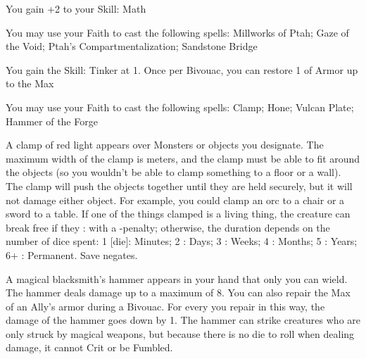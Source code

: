 {\GOD[
Name=Ptah,
Link=small-god-ptah,
GodOf=God of Builders,
Holy=an amulet in the shape of an ankh
]


You gain +2 to your Skill: Math


You may use your Faith to cast the following spells: Millworks of Ptah; Gaze of the Void; Ptah's Compartmentalization; Sandstone Bridge







\GOD[
Name=Vulcan,
Link=small-god-vulcan,
GodOf=Seraph of the Forge,
Holy=a small crude homonculous hammered from iron
]


You gain the Skill: Tinker at 1.  Once per Bivouac, you can restore 1 \UD of Armor up to the Max 


You may use your Faith to cast the following spells: Clamp; Hone; Vulcan Plate; Hammer of the Forge

\LITURGY [
  Name= Clamp,
  Link= vulcan-liturgy-clamp,
  Paradigm= Force ,
  Save=  Y (negates) ,
  Duration= varies ,
  Counter=  n/a  ,
  Keywords= Contested ,
  Target=   Nearby object or Monster
]



A clamp of red light appears over \DICE Monsters or objects you designate. The maximum width of the clamp is \DICE meters, and the clamp must be able to fit around the objects (so you wouldn't be able to clamp something to a floor or a wall).  The clamp will push the objects together until they are held securely, but it will not damage either object.  For example, you could clamp an orc to a chair or a sword to a table.  If one of the things clamped is a living thing, the creature can break free if they \RB : \VIG with a -\DICE penalty; otherwise, the duration depends on the number of dice spent:  1 [die]: Minutes; 2 \DICE: Days; 3 \DICE: Weeks; 4 \DICE: Months; 5 \DICE: Years; 6+ \DICE: Permanent.  Save negates.

\LITURGY [
  Name= Hammer of the Forge,
  Link=vulcan-liturgy-hammer,
  Paradigm= Force ,
  Save=  N ,
  Duration= Session ,
  Counter=  n/a  ,
  Keywords= None ,
  Target=   Self
]



A magical blacksmith's hammer appears in your hand that only you can wield.  The hammer deals \DICE damage up to a maximum of 8.  You can also repair the Max \UD of an Ally's armor during a Bivouac.  For every \DCUP you repair in this way, the damage of the hammer goes down by 1.  The hammer can strike creatures who are only struck by magical weapons, but because there is no die to roll when dealing damage, it cannot Crit or be Fumbled.

}
